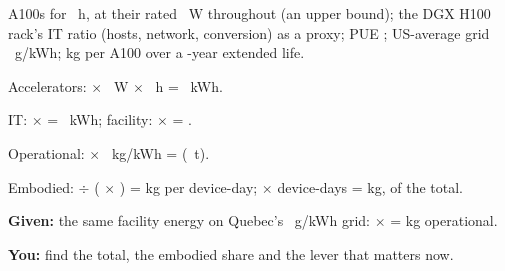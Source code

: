 \documentclass{studysheet}
\begin{document}
\begin{leftcol}
\begin{practicebox}
 A100s for ~h, \assumed{} at their rated ~W throughout (an upper
bound); the DGX H100 rack's IT ratio  (hosts, network, conversion) as a proxy;
PUE ; US-average grid ~g/kWh;  kg per A100 over a
-year extended life.\par\vspace{2pt}
\begin{steps}
\item Accelerators:  $\times$ ~W $\times$ ~h = ~kWh.
\item IT: $\times$  = ~kWh; facility: $\times$  = .
\item Operational:  $\times$ ~kg/kWh =  (~t).
\item Embodied:  $\div$ ( $\times$ ) =  kg per
  device-day; $\times$  device-days =  kg,  of the total.
\end{steps}
\end{practicebox}

\vspace{10pt}
\begin{practicebox}
\textbf{Given:} the same facility energy on Quebec's ~g/kWh grid:  $\times$
 =  kg operational.\par
\textbf{You:} find the total, the embodied share and the lever that matters now.\par\vspace{72pt}
\end{practicebox}
\end{leftcol}%
\end{document}
